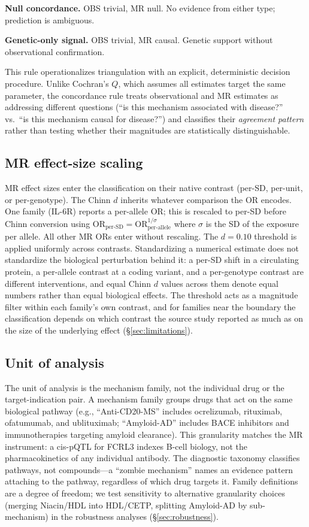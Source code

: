 \documentclass[11pt]{article}
\begin{document}
\textbf{Null concordance.} OBS trivial, MR null. No evidence from either type; prediction is ambiguous.

\textbf{Genetic-only signal.} OBS trivial, MR causal. Genetic support without observational confirmation.

This rule operationalizes triangulation \cite{lawlor2016} with an explicit, deterministic decision procedure. Unlike Cochran's $Q$, which assumes all estimates target the same parameter, the concordance rule treats observational and MR estimates as addressing different questions (``is this mechanism associated with disease?'' vs.\ ``is this mechanism causal for disease?'') and classifies their \emph{agreement pattern} rather than testing whether their magnitudes are statistically distinguishable.

\subsection{MR effect-size scaling}

MR effect sizes enter the classification on their native contrast (per-SD, per-unit, or per-genotype). The Chinn $d$ inherits whatever comparison the OR encodes. One family (IL-6R) reports a per-allele OR; this is rescaled to per-SD before Chinn conversion using $\text{OR}_{\text{per-SD}} = \text{OR}_{\text{per-allele}}^{1/\sigma}$ where $\sigma$ is the SD of the exposure per allele. All other MR ORs enter without rescaling. The $d = 0.10$ threshold is applied uniformly across contrasts. Standardizing a numerical estimate does not standardize the biological perturbation behind it: a per-SD shift in a circulating protein, a per-allele contrast at a coding variant, and a per-genotype contrast are different interventions, and equal Chinn $d$ values across them denote equal numbers rather than equal biological effects. The threshold acts as a magnitude filter within each family's own contrast, and for families near the boundary the classification depends on which contrast the source study reported as much as on the size of the underlying effect (\S\ref{sec:limitations}).

\subsection{Unit of analysis}

The unit of analysis is the mechanism family, not the individual drug or the target-indication pair. A mechanism family groups drugs that act on the same biological pathway (e.g., ``Anti-CD20-MS'' includes ocrelizumab, rituximab, ofatumumab, and ublituximab; ``Amyloid-AD'' includes BACE inhibitors and immunotherapies targeting amyloid clearance). This granularity matches the MR instrument: a cis-pQTL for FCRL3 indexes B-cell biology, not the pharmacokinetics of any individual antibody. The diagnostic taxonomy classifies pathways, not compounds---a ``zombie mechanism'' names an evidence pattern attaching to the pathway, regardless of which drug targets it. Family definitions are a degree of freedom; we test sensitivity to alternative granularity choices (merging Niacin/HDL into HDL/CETP, splitting Amyloid-AD by sub-mechanism) in the robustness analyses (\S\ref{sec:robustness}).
\end{document}
